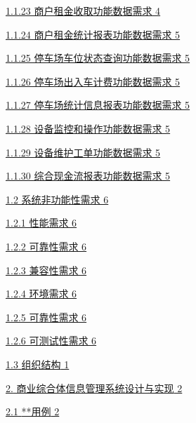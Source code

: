\documentclass[]{article}
\begin{document}
\protect\hyperlink{ux5546ux6237ux79dfux91d1ux6536ux53d6ux529fux80fdux6570ux636eux9700ux6c42}{1.1.23
商户租金收取功能数据需求 4}

\protect\hyperlink{ux5546ux6237ux79dfux91d1ux7edfux8ba1ux62a5ux8868ux529fux80fdux6570ux636eux9700ux6c42}{1.1.24
商户租金统计报表功能数据需求 5}

\protect\hyperlink{ux505cux8f66ux573aux8f66ux4f4dux72b6ux6001ux67e5ux8be2ux529fux80fdux6570ux636eux9700ux6c42}{1.1.25
停车场车位状态查询功能数据需求 5}

\protect\hyperlink{ux505cux8f66ux573aux51faux5165ux8f66ux8ba1ux8d39ux529fux80fdux6570ux636eux9700ux6c42}{1.1.26
停车场出入车计费功能数据需求 5}

\protect\hyperlink{ux505cux8f66ux573aux7edfux8ba1ux4fe1ux606fux62a5ux8868ux529fux80fdux6570ux636eux9700ux6c42}{1.1.27
停车场统计信息报表功能数据需求 5}

\protect\hyperlink{ux8bbeux5907ux76d1ux63a7ux548cux64cdux4f5cux529fux80fdux6570ux636eux9700ux6c42}{1.1.28
设备监控和操作功能数据需求 5}

\protect\hyperlink{ux8bbeux5907ux7ef4ux62a4ux5de5ux5355ux529fux80fdux6570ux636eux9700ux6c42}{1.1.29
设备维护工单功能数据需求 5}

\protect\hyperlink{ux7efcux5408ux73b0ux91d1ux6d41ux62a5ux8868ux529fux80fdux6570ux636eux9700ux6c42}{1.1.30
综合现金流报表功能数据需求 5}

\protect\hyperlink{ux7cfbux7edfux975eux529fux80fdux6027ux9700ux6c42}{1.2
系统非功能性需求 6}

\protect\hyperlink{ux6027ux80fdux9700ux6c42}{1.2.1 性能需求 6}

\protect\hyperlink{ux53efux9760ux6027ux9700ux6c42}{1.2.2 可靠性需求 6}

\protect\hyperlink{ux517cux5bb9ux6027ux9700ux6c42}{1.2.3 兼容性需求 6}

\protect\hyperlink{ux73afux5883ux9700ux6c42}{1.2.4 环境需求 6}

\protect\hyperlink{ux53efux9760ux6027ux9700ux6c42-1}{1.2.5 可靠性需求 6}

\protect\hyperlink{ux53efux6d4bux8bd5ux6027ux9700ux6c42}{1.2.6
可测试性需求 6}

\protect\hyperlink{_Toc77076515}{{1.3} {组织结构} 1}

\protect\hyperlink{ux5546ux4e1aux7efcux5408ux4f53ux4fe1ux606fux7ba1ux7406ux7cfbux7edfux8bbeux8ba1ux4e0eux5b9eux73b0}{{2.}
商业综合体信息管理{系统设计与实现} 2}

\protect\hyperlink{ux7528ux6237ux7528ux4f8b}{{2.1} {**用例} 2}
\end{document}
